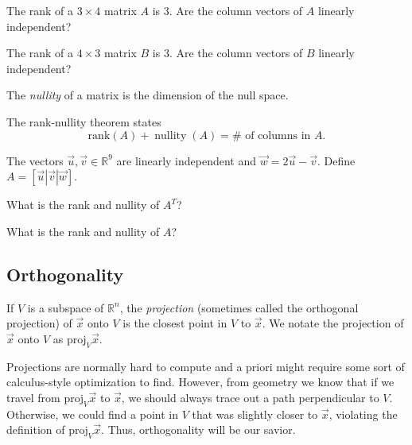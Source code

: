 \documentclass[14pt]{problemset}
\newcommand{\R}{\mathbb{R}}
\newcommand{\proj}{\mathrm{proj}}
\newcommand{\rank}{\mathrm{rank}}
\newcommand{\nnul}{\operatorname{nullity}}
\begin{document}
	\question
	\begin{parts}
		\item The rank of a $3\times 4$ matrix $A$ is $3$.  Are the column vectors of $A$ linearly independent?
		\item The rank of a $4\times 3$ matrix $B$ is $3$.  Are the column vectors of $B$ linearly independent?
	\end{parts}




	\begin{theorem}
	The \emph{nullity} of a matrix is the dimension of the null space.

	The rank-nullity theorem states
	\[
		\rank(A)+\nnul(A) = \#\text{ of columns in }A.
	\]
	\end{theorem}

	\question
	The vectors $\vec u,\vec v\in\R^9$ are linearly independent and $\vec w=2\vec u-\vec v$.
	Define $A=[\vec u|\vec v|\vec w]$.
	\begin{parts}
		\item What is the rank and nullity of $A^T$?
		\item What is the rank and nullity of $A$?
	\end{parts}

\subsection*{Orthogonality}

	\begin{definition}
		If $V$ is a subspace of $\R^n$, the \emph{projection}
		(sometimes called the orthogonal projection) of $\vec x$ onto $V$
		is the closest point in $V$ to $\vec x$. We notate the projection
		of $\vec x$ onto $V$ as $\proj_V\vec x$.
	\end{definition}

	Projections are normally hard to compute and a priori might require some sort
	of calculus-style optimization to find.  However, from geometry we know that 
	if we travel from $\proj_V \vec x$ to $\vec x$, we should always trace out a path
	perpendicular to $V$.  Otherwise, we could find a point in $V$ that was slightly closer
	to $\vec x$, violating the definition of $\proj_V \vec x$.  Thus, orthogonality
	will be our savior.
\end{document}
